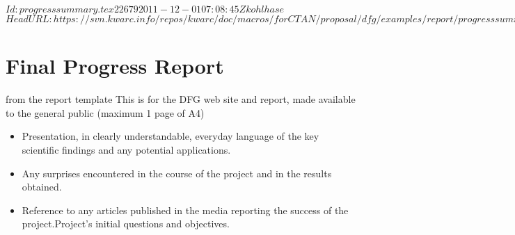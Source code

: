 \svnInfo $Id: progresssummary.tex 22679 2011-12-01 07:08:45Z kohlhase $
\svnKeyword $HeadURL: https://svn.kwarc.info/repos/kwarc/doc/macros/forCTAN/proposal/dfg/examples/report/progresssummary.tex $
\section{Final Progress Report}
\begin{todo}{from the report template}
  This is for the DFG web site and report, made available to the general public (maximum 1 page of A4)
  \begin{itemize}
  \item Presentation, in clearly understandable, everyday language of the key scientific
    findings and any potential applications.
  \item Any surprises encountered in the course of the project and in the results
    obtained.
  \item Reference to any articles published in the media reporting the success of the
    project.Project’s initial questions and objectives.
  \end{itemize}
\end{todo}

